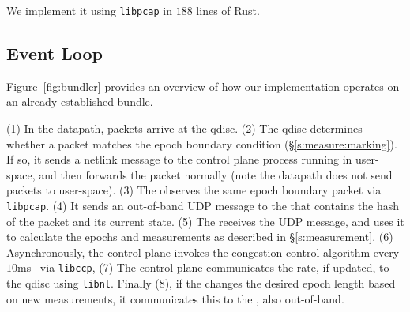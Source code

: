 \Para{\capoutbox} We implement it using \texttt{libpcap} in $188$ lines of Rust. 

\subsection{\name Event Loop}\label{s:impl:loop}
Figure~\ref{fig:bundler} provides an overview of how our \name implementation operates on an already-established bundle.

(1) In the datapath, packets arrive at the \inbox qdisc.
(2) The qdisc determines whether a packet matches the epoch boundary condition (\S\ref{s:measure:marking}). 
If so, it sends a netlink message to the control plane process running in user-space, and then forwards the packet normally (note the datapath does not send packets to user-space). 
(3) The \outbox observes the same epoch boundary packet via \texttt{libpcap}.
(4) It sends an out-of-band UDP message to the \inbox that contains the hash of the packet and its current state. 
(5) The \inbox receives the UDP message, and uses it to calculate the epochs and measurements as described 
in \S\ref{s:measurement}. 
(6) Asynchronously, the \inbox control plane invokes the congestion control algorithm every $10$ms~\cite{ccp}
via \texttt{libccp},
(7) The \inbox control plane communicates the rate, if updated, to the qdisc
using \texttt{libnl}. 
Finally (8), if the \inbox changes the desired epoch length based on new measurements, it communicates this to the \outbox, also out-of-band.

